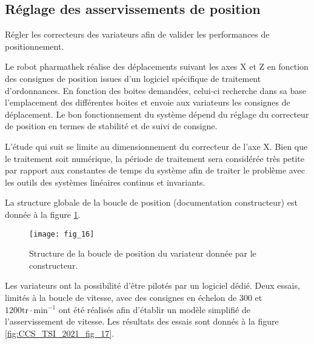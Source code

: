 \subsection{Réglage des asservissements de position}

\begin{obj}
Régler les correcteurs des variateurs afin de valider les performances de positionnement.
\end{obj}

Le robot pharmathek réalise des déplacements suivant les axes X et Z en fonction des consignes de position issues d'un logiciel spécifique de traitement d'ordonnances. En fonction des boites demandées, celui-ci recherche dans sa base l'emplacement des différentes boites et envoie aux variateurs les consignes de déplacement. Le bon fonctionnement du système dépend du réglage du correcteur de position en termes de stabilité et de suivi de consigne.

L'étude qui suit se limite au dimensionnement du correcteur de l'axe X. Bien que le traitement soit numérique, la période de traitement sera considérée très petite par rapport aux constantes de temps du système afin de traiter le problème avec les outils des systèmes linéaires continus et invariants.

La structure globale de la boucle de position (documentation constructeur) est donnée à la figure \ref{fig:CCS_TSI_2021_fig_16}.

\begin{figure}
\centering
\texttt{[image: fig\_16]}
\caption{\label{fig:CCS_TSI_2021_fig_16}Structure de la boucle de position du variateur donnée par le constructeur.}
\end{figure}


Les variateurs ont la possibilité d'être pilotés par un logiciel dédié. Deux essais, limités à la boucle de vitesse, avec des consignes en échelon de 300 et $1200 \mathrm{tr} \cdot \mathrm{min}^{-1}$ ont été réalisés afin d'établir un modèle simplifié de l'asservissement de vitesse. Les résultats des essais sont donnés à la figure \ref{fig:CCS_TSI_2021_fig_17}.

